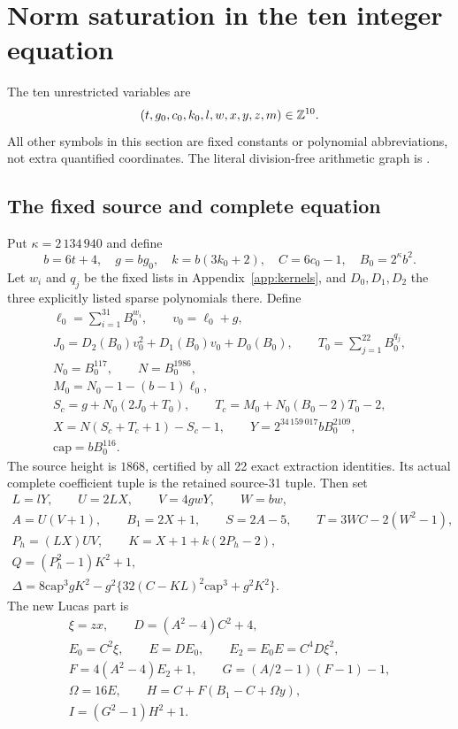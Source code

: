 \section{Norm saturation in the ten integer equation}\label{sec:lucas}
The ten unrestricted variables are
\[
 (t,g_0,c_0,k_0,l,w,x,y,z,m)\in\mathbb Z^{10}.
\]
All other symbols in this section are fixed constants or polynomial
abbreviations, not extra quantified coordinates. The literal division-free
arithmetic graph is .

\subsection{The fixed source and complete equation}
Put $\kappa=2\,134\,940$ and define
\[
 b=6t+4,\quad g=bg_0,\quad k=b(3k_0+2),\quad C=6c_0-1,
 \quad B_0=2^\kappa b^2.
\]
Let $w_i$ and $q_j$ be the fixed lists in Appendix~\ref{app:kernels},
and $D_0,D_1,D_2$ the three explicitly listed sparse polynomials there.
Define
\begin{gather*}
 \ell_0=\sum_{i=1}^{31}B_0^{w_i},\qquad  v_0=\ell_0+g,\\
 J_0=D_2(B_0)v_0^2+D_1(B_0)v_0+D_0(B_0),\qquad 
 T_0=\sum_{j=1}^{22}B_0^{q_j},\\
 N_0=B_0^{117},\qquad N=B_0^{1986},\\
 M_0=N_0-1-(b-1)\ell_0,\\
 S_c=g+N_0(2J_0+T_0),\qquad T_c=M_0+N_0(B_0-2)T_0-2,\\
 X=N(S_c+T_c+1)-S_c-1,\qquad Y=2^{34\,159\,017}bB_0^{2109},\\
 \mathrm{cap}=bB_0^{116}.
\end{gather*}
The source height is $1868$, certified by all 22 exact extraction identities.
Its actual complete coefficient tuple is the retained source-31 tuple.
Then set
\begin{gather*}
 L=lY,\qquad U=2LX,\qquad V=4gwY,\qquad W=bw,\\
 A=U(V+1),\qquad B_1=2X+1,\qquad S=2A-5,\qquad T=3WC-2(W^2-1),\\
 P_h=(LX)UV,\qquad K=X+1+k(2P_h-2),\qquad \\
 Q=(P_h^2-1)K^2+1,\qquad \\
 \Delta=8\mathrm{cap}^3gK^2
 -g^2\{32(C-KL)^2\mathrm{cap}^3+g^2K^2\}.
\end{gather*}
The new Lucas part is
\begin{gather*}
 \xi=zx,\qquad D=(A^2-4)C^2+4,\\
 E_0=C^2\xi,\qquad E=DE_0,\qquad E_2=E_0E=C^4D\xi^2,\\
 F=4(A^2-4)E_2+1,\qquad G=(A/2-1)(F-1)-1,\\
 \Omega=16E,\qquad H=C+F(B_1-C+\Omega y),\\
 I=(G^2-1)H^2+1.
\end{gather*}
